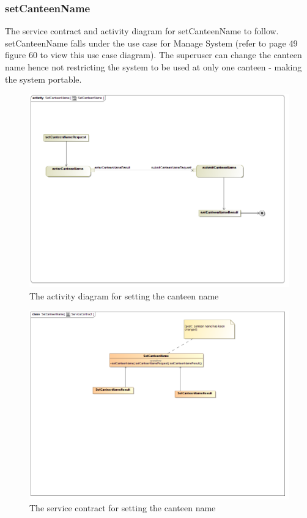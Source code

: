 \documentclass[a4paper,12pt]{report}
\begin{document}
\subsubsection{setCanteenName}
The service contract and activity diagram for setCanteenName to follow. setCanteenName falls under the use case for Manage System (refer to page 49 figure 60 to view this use case diagram). The superuser can change the canteen name hence not restricting the system to be used at only one canteen - making the system portable. 
\begin{figure}[H]
  \centering
    \includegraphics[width=1.0\textwidth]{../images/SetCanteenNameActivity.png}
    \caption{The activity diagram for setting the canteen name} 
\end{figure}

\begin{figure}[H]
	\centering
	\includegraphics[width=1.0\textwidth]{../images/SetCanteenServiceContract.png}
	\caption{The service contract for setting the canteen name}
\end{figure}
\end{document}
